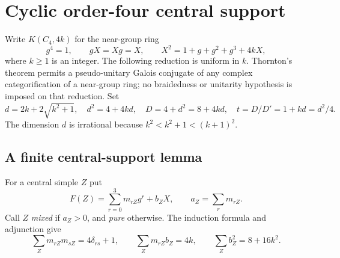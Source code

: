 \section{Cyclic order-four central support}\label{sec:cyclic}
Write $K(C_4,4k)$ for the near-group ring
\[
 g^4=1,\qquad gX=Xg=X,\qquad
 X^2=1+g+g^2+g^3+4kX,
\]
where $k\ge1$ is an integer. The following reduction is uniform in $k$.
Thornton's theorem \cite[Theorem 1.3]{Thornton} permits a pseudo-unitary
Galois conjugate of any complex categorification of a near-group ring;
no braidedness or unitarity hypothesis is imposed on that reduction.
Set
\[
 d=2k+2\sqrt{k^2+1},\quad d^2=4+4kd,\quad
 D=4+d^2=8+4kd,\quad t=D/D'=1+kd=d^2/4.
\]
The dimension $d$ is irrational because $k^2<k^2+1<(k+1)^2$.

\subsection{A finite central-support lemma}
For a central simple $Z$ put
\[
 F(Z)=\sum_{r=0}^3m_{rZ}g^r+b_ZX,\qquad a_Z=\sum_r m_{rZ}.
\]
Call $Z$ \emph{mixed} if $a_Z>0$, and \emph{pure} otherwise.
The induction formula and adjunction give
\begin{equation}\label{eq:ng-gram}
 \sum_Zm_{rZ}m_{sZ}=4\delta_{rs}+1,\qquad
 \sum_Zm_{rZ}b_Z=4k,\qquad
 \sum_Zb_Z^2=8+16k^2.
\end{equation}

